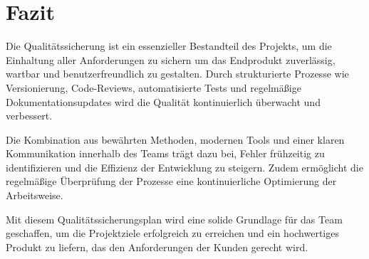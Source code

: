 \documentclass[a4paper,12pt]{article}
\begin{document}
\newpage
\section{Fazit}
Die Qualitätssicherung ist ein essenzieller Bestandteil des Projekts, um die Einhaltung aller Anforderungen zu sichern um das Endprodukt zuverlässig, wartbar und benutzerfreundlich zu gestalten. Durch strukturierte Prozesse wie Versionierung, Code-Reviews, automatisierte Tests und regelmäßige Dokumentationsupdates wird die Qualität kontinuierlich überwacht und verbessert.

Die Kombination aus bewährten Methoden, modernen Tools und einer klaren Kommunikation innerhalb des Teams trägt dazu bei, Fehler frühzeitig zu identifizieren und die Effizienz der Entwicklung zu steigern. Zudem ermöglicht die regelmäßige Überprüfung der Prozesse eine kontinuierliche Optimierung der Arbeitsweise.

Mit diesem Qualitätssicherungsplan wird eine solide Grundlage für das Team geschaffen, um die Projektziele erfolgreich zu erreichen und ein hochwertiges Produkt zu liefern, das den Anforderungen der Kunden gerecht wird.

\newpage
\printbibliography
\end{document}
